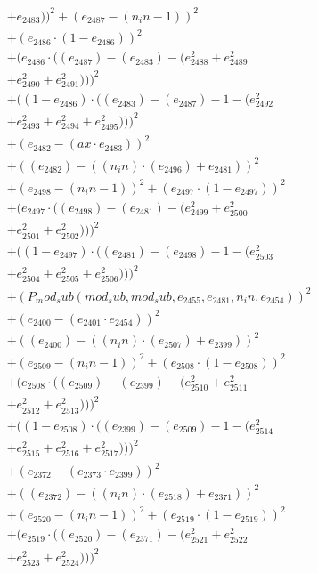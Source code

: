 \documentclass[10pt, a4paper]{article}
\begin{document}
\begin{align*}
& + e_{2483}))^{2} + (e_{2487} - (n_in - 1))^{2} \\
& + (e_{2486}  \cdot  (1 - e_{2486}))^{2} \\
& + (e_{2486}  \cdot  ((e_{2487}) - (e_{2483}) - (e_{2488}^{2} + e_{2489}^{2} \\
& + e_{2490}^{2} + e_{2491}^{2})))^{2} \\
& + ((1 - e_{2486})  \cdot  ((e_{2483}) - (e_{2487}) - 1 - (e_{2492}^{2} \\
& + e_{2493}^{2} + e_{2494}^{2} + e_{2495}^{2})))^{2} \\
& + (e_{2482} - (ax  \cdot  e_{2483}))^{2} \\
& + ((e_{2482}) - ((n_in)  \cdot  (e_{2496}) + e_{2481}))^{2} \\
& + (e_{2498} - (n_in - 1))^{2} + (e_{2497}  \cdot  (1 - e_{2497}))^{2} \\
& + (e_{2497}  \cdot  ((e_{2498}) - (e_{2481}) - (e_{2499}^{2} + e_{2500}^{2} \\
& + e_{2501}^{2} + e_{2502}^{2})))^{2} \\
& + ((1 - e_{2497})  \cdot  ((e_{2481}) - (e_{2498}) - 1 - (e_{2503}^{2} \\
& + e_{2504}^{2} + e_{2505}^{2} + e_{2506}^{2})))^{2} \\
& + (P_mod_sub(mod_sub, mod_sub, e_{2455}, e_{2481}, n_in, e_{2454}))^{2} \\
& + (e_{2400} - (e_{2401}  \cdot  e_{2454}))^{2} \\
& + ((e_{2400}) - ((n_in)  \cdot  (e_{2507}) + e_{2399}))^{2} \\
& + (e_{2509} - (n_in - 1))^{2} + (e_{2508}  \cdot  (1 - e_{2508}))^{2} \\
& + (e_{2508}  \cdot  ((e_{2509}) - (e_{2399}) - (e_{2510}^{2} + e_{2511}^{2} \\
& + e_{2512}^{2} + e_{2513}^{2})))^{2} \\
& + ((1 - e_{2508})  \cdot  ((e_{2399}) - (e_{2509}) - 1 - (e_{2514}^{2} \\
& + e_{2515}^{2} + e_{2516}^{2} + e_{2517}^{2})))^{2} \\
& + (e_{2372} - (e_{2373}  \cdot  e_{2399}))^{2} \\
& + ((e_{2372}) - ((n_in)  \cdot  (e_{2518}) + e_{2371}))^{2} \\
& + (e_{2520} - (n_in - 1))^{2} + (e_{2519}  \cdot  (1 - e_{2519}))^{2} \\
& + (e_{2519}  \cdot  ((e_{2520}) - (e_{2371}) - (e_{2521}^{2} + e_{2522}^{2} \\
& + e_{2523}^{2} + e_{2524}^{2})))^{2} \\

\end{align*}
\end{document}
